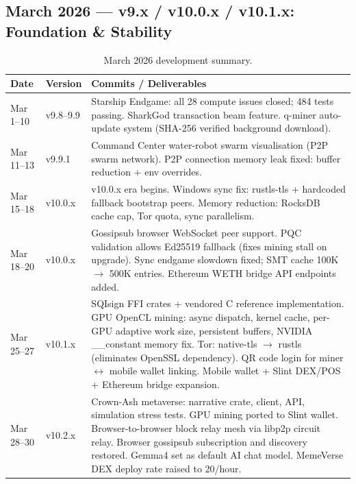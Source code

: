 \documentclass[12pt,a4paper]{article}
\begin{document}
\subsection*{March 2026 — v9.x / v10.0.x / v10.1.x: Foundation \& Stability}

\begin{table}[H]
\centering
\small
\renewcommand{\arraystretch}{1.28}
\begin{tabularx}{\linewidth}{@{}l l X@{}}
\toprule
\textbf{Date} & \textbf{Version} & \textbf{Commits / Deliverables} \\
\midrule
Mar 1--10 & v9.8--9.9 &
  Starship Endgame: all 28 compute issues closed; 484 tests passing.
  SharkGod transaction beam feature.
  q-miner auto-update system (SHA-256 verified background download). \\
\rowcolor{qblue!10}
Mar 11--13 & v9.9.1 &
  Command Center water-robot swarm visualisation (P2P swarm network).
  P2P connection memory leak fixed: buffer reduction + env overrides. \\
Mar 15--18 & v10.0.x &
  v10.0.x era begins.
  Windows sync fix: rustls-tls + hardcoded fallback bootstrap peers.
  Memory reduction: RocksDB cache cap, Tor quota, sync parallelism. \\
\rowcolor{qblue!10}
Mar 18--20 & v10.0.x &
  Gossipsub browser WebSocket peer support.
  PQC validation allows Ed25519 fallback (fixes mining stall on upgrade).
  Sync endgame slowdown fixed; SMT cache 100K $\to$ 500K entries.
  Ethereum WETH bridge API endpoints added. \\
Mar 25--27 & v10.1.x &
  SQIsign FFI crates + vendored C reference implementation.
  GPU OpenCL mining: async dispatch, kernel cache, per-GPU adaptive work size,
  persistent buffers, NVIDIA \_\_constant memory fix.
  Tor: native-tls $\to$ rustls (eliminates OpenSSL dependency).
  QR code login for miner $\leftrightarrow$ mobile wallet linking.
  Mobile wallet + Slint DEX/POS + Ethereum bridge expansion. \\
\rowcolor{qblue!10}
Mar 28--30 & v10.2.x &
  Crown-Ash metaverse: narrative crate, client, API, simulation stress tests.
  GPU mining ported to Slint wallet.
  Browser-to-browser block relay mesh via libp2p circuit relay.
  Browser gossipsub subscription and discovery restored.
  Gemma4 set as default AI chat model.
  MemeVerse DEX deploy rate raised to 20/hour. \\
\bottomrule
\end{tabularx}
\caption{March 2026 development summary.}
\end{table}
\end{document}
